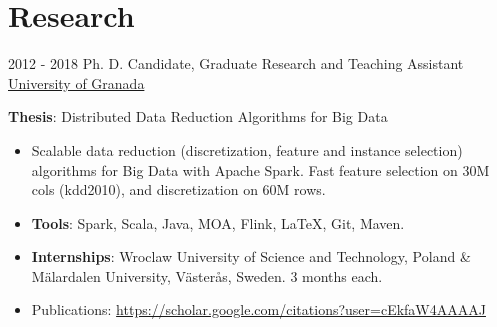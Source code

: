 \documentclass[letterpaper]{twentysecondcv} %
\begin{document}
\section{Research}
\begin{twenty}
	\twentyitem
    	{2012 - 2018}
		{}
        {Ph. D. Candidate, Graduate Research and Teaching Assistant}
        {\href{http://www.ugr.es/}{University of Granada}}
        {}
        {
       	\textbf{Thesis}: Distributed Data Reduction Algorithms for Big Data
        {\begin{itemize}
        \item Scalable data reduction (discretization, feature and instance selection) algorithms for Big Data with Apache Spark. Fast feature selection on 30M cols (kdd2010), and discretization on 60M rows.
        \item \textbf{Tools}: Spark, Scala, Java, MOA, Flink, \LaTeX, Git, Maven.
        \item \textbf{Internships}: Wroclaw University of Science and Technology, Poland \& M\"alardalen University, V\"aster\aa s, Sweden. 3 months each.        
        \item Publications: \url{https://scholar.google.com/citations?user=cEkfaW4AAAAJ}
		\end{itemize}}
        }
\end{twenty}
\end{document}
